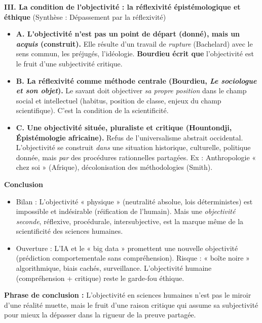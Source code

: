 \documentclass[11pt]{article}
\begin{document}
\begin{exoresolu}
    \textbf{III. La condition de l'objectivité : la réflexivité épistémologique et éthique} (Synthèse : Dépassement par la réflexivité)
    \begin{itemize}
        \item \textbf{A. L'objectivité n'est pas un point de départ (donné), mais un \emph{acquis} (construit).} Elle résulte d'un travail de \emph{rupture} (Bachelard) avec le sens commun, les préjugés, l'idéologie. \textbf{Bourdieu écrit que} l'objectivité est le fruit d'une subjectivité critique.
        \item \textbf{B. La réflexivité comme méthode centrale (Bourdieu, \emph{Le sociologue et son objet}).} Le savant doit objectiver \emph{sa propre position} dans le champ social et intellectuel (habitus, position de classe, enjeux du champ scientifique). C'est la condition de la scientificité.
        \item \textbf{C. Une objectivité située, pluraliste et critique (Hountondji, Épistémologie africaine).} Refus de l'universalisme abstrait occidental. L'objectivité se construit \emph{dans} une situation historique, culturelle, politique donnée, mais \emph{par} des procédures rationnelles partagées. Ex : Anthropologie « chez soi » (Afrique), décolonisation des méthodologies (Smith).
    \end{itemize}

    \textbf{Conclusion}
    \begin{itemize}
        \item Bilan : L'objectivité « physique » (neutralité absolue, lois déterministes) est impossible et indésirable (réification de l'humain). Mais une \emph{objectivité seconde}, réflexive, procédurale, intersubjective, est la marque même de la scientificité des sciences humaines.
        \item Ouverture : L'IA et le « big data » promettent une nouvelle objectivité (prédiction comportementale sans compréhension). Risque : « boîte noire » algorithmique, biais cachés, surveillance. L'objectivité humaine (compréhension + critique) reste le garde-fou éthique.
    \end{itemize}
    \textbf{Phrase de conclusion :} \guillemotleft L'objectivité en sciences humaines n'est pas le miroir d'une réalité muette, mais le fruit d'une raison critique qui assume sa subjectivité pour mieux la dépasser dans la rigueur de la preuve partagée. \guillemotright
\end{exoresolu}
\end{document}
